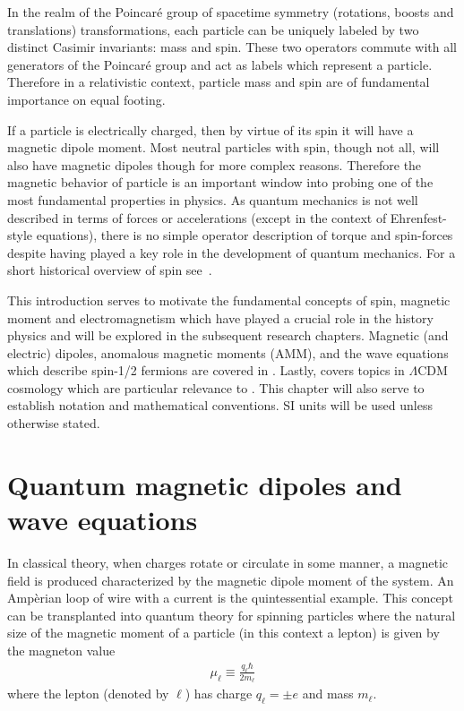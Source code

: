 In the realm of the Poincar{\'e} group of spacetime symmetry (rotations, boosts and translations) transformations, each particle can be uniquely labeled by two distinct Casimir invariants: mass and spin. These two operators commute with all generators of the Poincar{\'e} group and act as labels which represent a particle. Therefore in a relativistic context, particle mass and spin are of fundamental importance on equal footing.

If a particle is electrically charged, then by virtue of its spin it will have a magnetic dipole moment. Most neutral particles with spin, though not all, will also have magnetic dipoles though for more complex reasons. Therefore the magnetic behavior of particle is an important window into probing one of the most fundamental properties in physics. As quantum mechanics is not well described in terms of forces or accelerations (except in the context of Ehrenfest-style equations), there is no simple operator description of torque and spin-forces despite having played a key role in the development of quantum mechanics. For a short historical overview of spin see~\cite{ohanian1986spin}.

This introduction serves to motivate the fundamental concepts of spin, magnetic moment and electromagnetism which have played a crucial role in the history physics and will be explored in the subsequent research chapters. Magnetic (and electric) dipoles, anomalous magnetic moments (AMM), and the wave equations which describe spin-1/2 fermions are covered in . Lastly,  covers topics in $\Lambda\mathrm{CDM}$ cosmology which are particular relevance to . This chapter will also serve to establish notation and mathematical conventions. SI units will be used unless otherwise stated.



\section{Quantum magnetic dipoles and wave equations}
\label{sec:mom}
In classical theory, when charges rotate or circulate in some manner, a magnetic field is produced characterized by the magnetic dipole moment of the system. An Amp{\`e}rian loop of wire with a current is the quintessential example. This concept can be transplanted into quantum theory for spinning particles where the natural size of the magnetic moment of a particle (in this context a lepton) is given by the magneton value
\begin{gather}
    \label{mag:1}
    \mu_{\ell}\equiv\frac{q_{\ell}\hbar}{2m_{\ell}}
\end{gather}
where the lepton (denoted by $\ell$) has charge $q_{\ell}=\pm e$ and mass $m_{\ell}$. 

